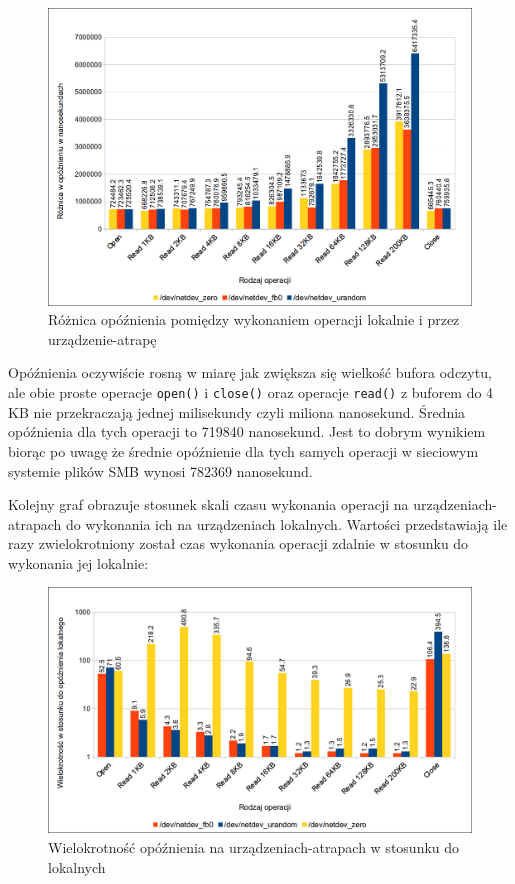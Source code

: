 \documentclass[11pt]{scrartcl}
\begin{document}
\begin{figure}[H]
    \caption{Różnica opóźnienia pomiędzy wykonaniem operacji lokalnie i przez urządzenie-atrapę}
    \includegraphics[width=\linewidth]{delaydiffs}
\end{figure}

Opóźnienia oczywiście rosną w miarę jak zwiększa się wielkość bufora odczytu, ale obie proste operacje \texttt{open()} i \texttt{close()} oraz operacje \texttt{read()} z buforem do 4 KB nie przekraczają jednej milisekundy czyli miliona nanosekund. Średnia opóźnienia dla tych operacji to 719840 nanosekund. Jest to dobrym wynikiem biorąc po uwagę że średnie opóźnienie dla tych samych operacji w sieciowym systemie plików SMB wynosi 782369 nanosekund.

Kolejny graf obrazuje stosunek skali czasu wykonania operacji na urządzeniach-atrapach do wykonania ich na urządzeniach lokalnych. Wartości przedstawiają ile razy zwielokrotniony został czas wykonania operacji zdalnie w stosunku do wykonania jej lokalnie:

\begin{figure}[H]
    \caption{Wielokrotność opóźnienia na urządzeniach-atrapach w stosunku do lokalnych}
    \includegraphics[width=\linewidth]{delayscale}
\end{figure}
\end{document}
